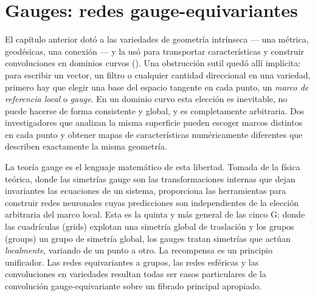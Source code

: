 \providecommand{\Ad}{\operatorname{Ad}}
\providecommand{\Hol}{\operatorname{Hol}}
\providecommand{\GL}{\operatorname{GL}}
\providecommand{\SO}{\operatorname{SO}}
\providecommand{\SU}{\operatorname{SU}}
\providecommand{\Ut}{\operatorname{U}}
\providecommand{\Ot}{\operatorname{O}}
\providecommand{\Mani}{\mathcal{M}}
\providecommand{\Lie}[1]{\mathfrak{#1}}
\providecommand{\Cl}{\operatorname{Cl}}
\providecommand{\Stab}{\operatorname{Stab}}
\providecommand{\Img}{\operatorname{Im}}
\providecommand{\rank}{\operatorname{rank}}
\providecommand{\dR}{\mathrm{dR}}
\providecommand{\softmax}{\operatorname{softmax}}

\chapter{Gauges: redes gauge-equivariantes}
\label{ch:gauges}

El cap\'itulo anterior dot\'o a las variedades de geometr\'ia intr\'inseca --- una
m\'etrica, geod\'esicas, una conexi\'on --- y la us\'o para transportar
caracter\'isticas y construir convoluciones en dominios curvos
(). Una obstrucci\'on sutil qued\'o all\'i impl\'icita: para
escribir un vector, un filtro o cualquier cantidad direccional en una variedad,
primero hay que elegir una base del espacio tangente en cada punto, un
\emph{marco de referencia local} o \emph{gauge}. En un dominio curvo esta
elecci\'on es inevitable, no puede hacerse de forma consistente y global, y es
completamente arbitraria. Dos investigadores que analizan la misma superficie
pueden escoger marcos distintos en cada punto y obtener mapas de
caracter\'isticas num\'ericamente diferentes que describen exactamente la misma
geometr\'ia.

La teor\'ia gauge es el lenguaje matem\'atico de esta libertad. Tomada de la
f\'isica te\'orica, donde las simetr\'ias gauge son las transformaciones internas
que dejan invariantes las ecuaciones de un sistema, proporciona las herramientas
para construir redes neuronales cuyas predicciones son independientes de la
elecci\'on arbitraria del marco local. Esta es la quinta y m\'as general de las
cinco G: donde las cuadr\'iculas (grids) explotan una simetr\'ia global de
traslaci\'on y los grupos (groups) un grupo de simetr\'ia global, los gauges
tratan simetr\'ias que act\'uan \emph{localmente}, variando de un punto a otro. La
recompensa es un principio unificador. Las redes equivariantes a grupos, las
redes esf\'ericas y las convoluciones en variedades resultan todas ser casos
particulares de la convoluci\'on gauge-equivariante sobre un fibrado principal
apropiado.


